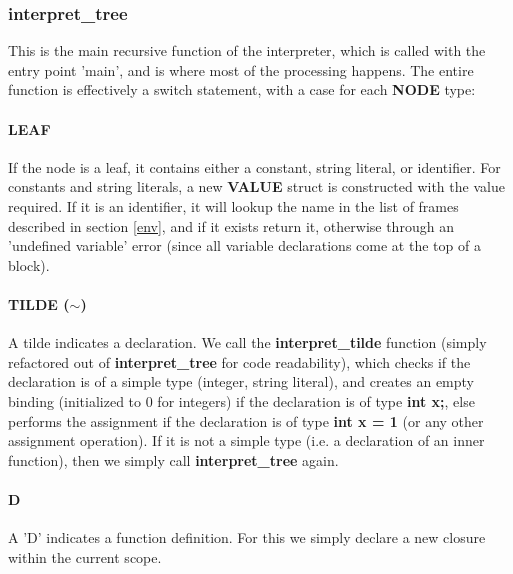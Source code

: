 \documentclass[12pt]{article}
\begin{document}
 \subsubsection{interpret\_tree} 
 This is the main recursive function of the interpreter, which is called with the entry point 'main', and is where most of the processing happens.
 The entire function is effectively a switch statement, with a case for each \textbf{NODE} type:
 \paragraph{LEAF}
 If the node is a leaf, it contains either a constant, string literal, or identifier. For constants and string literals, a new \textbf{VALUE} struct is constructed with the value required. If it is an identifier, it will lookup the name in the list of frames described in section \ref{env}, and if it exists return it, otherwise through an 'undefined variable' error (since all variable declarations come at the top of a block).
 \paragraph{TILDE ($\sim$)} A tilde indicates a declaration. We call the \textbf{interpret\_tilde} function (simply refactored out of \textbf{interpret\_tree} for code readability), which checks if the declaration is of a simple type (integer, string literal), and creates an empty binding (initialized to 0 for integers) if the declaration is of type \textbf{int x;}, else performs the assignment if the declaration is of type \textbf{int x = 1} (or any other assignment operation). If it is not a simple type (i.e. a declaration of an inner function), then we simply call \textbf{interpret\_tree} again.
 \paragraph{D} A 'D' indicates a function definition. For this we simply declare a new closure within the current scope. 
\end{document}
